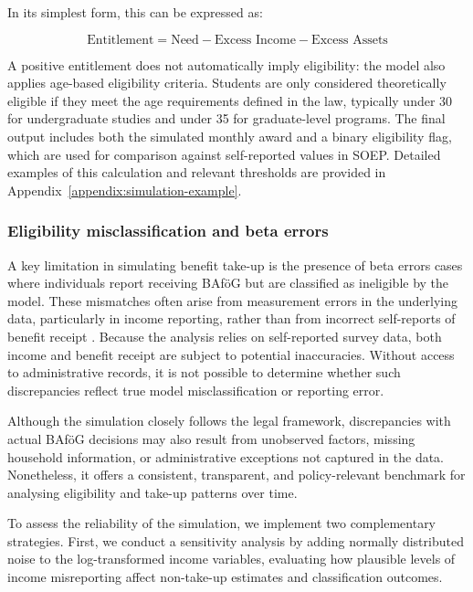 In its simplest form, this can be expressed as:

\begin{equation}
    \text{Entitlement} = \text{Need} - \text{Excess Income} - \text{Excess Assets}
\end{equation}

A positive entitlement does not automatically imply eligibility: the model also applies age-based eligibility criteria. 
Students are only considered theoretically eligible if they meet the age requirements defined in the law, typically under 30 for undergraduate studies and under 35 for graduate-level programs. 
The final output includes both the simulated monthly award and a binary eligibility flag, which are used for comparison against self-reported values in SOEP. 
Detailed examples of this calculation and relevant thresholds are provided in Appendix~\ref{appendix:simulation-example}.

\subsubsection{Eligibility misclassification and beta errors}
A key limitation in simulating benefit take-up is the presence of beta errors cases where individuals report receiving BAföG but are classified as ineligible by the model. 
These mismatches often arise from measurement errors in the underlying data, particularly in income reporting, rather than from incorrect self-reports of benefit receipt \citep{frick_claim_2007, janssens_takemod_2022}. 
Because the analysis relies on self-reported survey data, both income and benefit receipt are subject to potential inaccuracies. 
Without access to administrative records, it is not possible to determine whether such discrepancies reflect true model misclassification or reporting error.

Although the simulation closely follows the legal framework, discrepancies with actual BAföG decisions may also result from unobserved factors, missing household information, or administrative exceptions not captured in the data. Nonetheless, it offers a consistent, transparent, and policy-relevant benchmark for analysing eligibility and take-up patterns over time.

To assess the reliability of the simulation, we implement two complementary strategies. 
First, we conduct a sensitivity analysis by adding normally distributed noise to the log-transformed income variables, evaluating how plausible levels of income misreporting affect non-take-up estimates and classification outcomes. 

